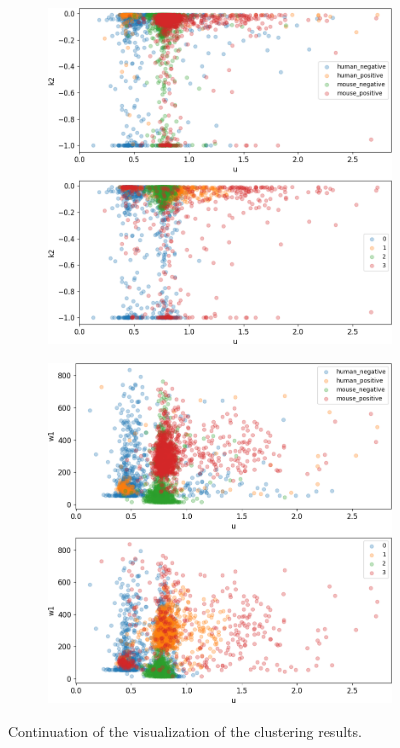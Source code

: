 \begin{figure}
\begin{subfigure}{0.49\textwidth}
	\end{subfigure}
	\hfill
	\begin{subfigure}{0.49\textwidth}
		\includegraphics[width=\textwidth]{fig/seperate_u_k2}
	\end{subfigure}
	\hfill
	\begin{subfigure}{0.49\textwidth}
		\includegraphics[width=\textwidth]{fig/seperate_u_w1}
	\end{subfigure}
	\caption{Continuation of the visualization of the clustering results.}
\label{fig:vis_output_seperate2}
\end{figure}

